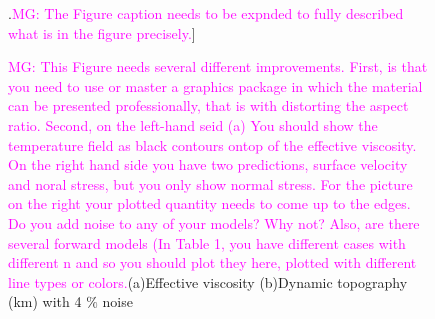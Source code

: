 \documentclass[12pt]{article}
\newcommand{\mgnote}[1]{\textcolor{magenta}{MG: #1}}
\begin{document}
\begin{figure}[H]
\centering
{}
\caption{\mgnote{This Figure needs several different improvements. First, is that you need to use or master a graphics package in which the material can be presented professionally, that is with distorting the aspect ratio. Second, on the left-hand seid (a) You should show the temperature field as black contours ontop of the effective viscosity. On the right hand side you have two predictions, surface velocity and noral stress, but you only show normal stress. For the picture on the right your plotted quantity needs to come up to the edges. Do you add noise to any of your models? Why not? Also, are there several forward models (In Table 1, you have different cases with different n and so you should plot they here, plotted with different line types or colors.}(a)Effective viscosity (b)Dynamic topography (km) with 4 $\%$ noise}.\mgnote{The Figure caption needs to be expnded to fully described what is in the figure precisely.}] 
\label{fig:viscosity}
\end{figure}
 
\end{document}
